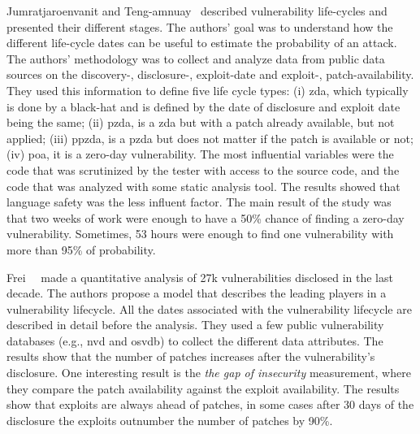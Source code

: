 Jumratjaroenvanit and Teng-amnuay~\cite{Jumratjaroenvanit:2008} described vulnerability life-cycles and presented their different stages. 
The authors' goal was to understand how the different life-cycle dates can be useful to estimate the probability of an attack. 
The authors' methodology was to collect and analyze data from public data sources on the discovery-, disclosure-, exploit-date and exploit-, patch-availability. 
They used this information to define five life cycle types: (i) \gls{zda}, which typically is done by a black-hat and is defined by the date of disclosure and exploit date being the same; (ii) \gls{pzda}, is a \gls{zda} but with a patch already available, but not applied; 
(iii) \gls{ppzda}, is a \gls{pzda} but does not matter if the patch is available or not; 
(iv) \gls{poa}, it is a zero-day vulnerability. 
The most influential variables were the code that was scrutinized by the tester with access to the source code, and the code that was analyzed with some static analysis tool. 
The results showed that language safety was the less influent factor. 
The main result of the study was that two weeks of work were enough to have a 50\% chance of finding a zero-day vulnerability. 
Sometimes, 53 hours were enough to find one vulnerability with more than 95\% of probability.


Frei~\etal{}~\cite{Frei:2010} made a quantitative analysis of 27k vulnerabilities disclosed in the last decade.
The authors propose a model that describes the leading players in a vulnerability lifecycle.
All the dates associated with the vulnerability lifecycle are described in detail before the analysis.
They used a few public vulnerability databases (e.g., \gls{nvd} and \gls{osvdb}) to collect the different data attributes.
The results show that the number of patches increases after the vulnerability's disclosure.  
One interesting result is the \emph{the gap of insecurity} measurement, where they compare the patch availability against the exploit availability. 
The results show that exploits are always ahead of patches, in some cases after 30 days of the disclosure the exploits outnumber the number of patches by 90\%.


